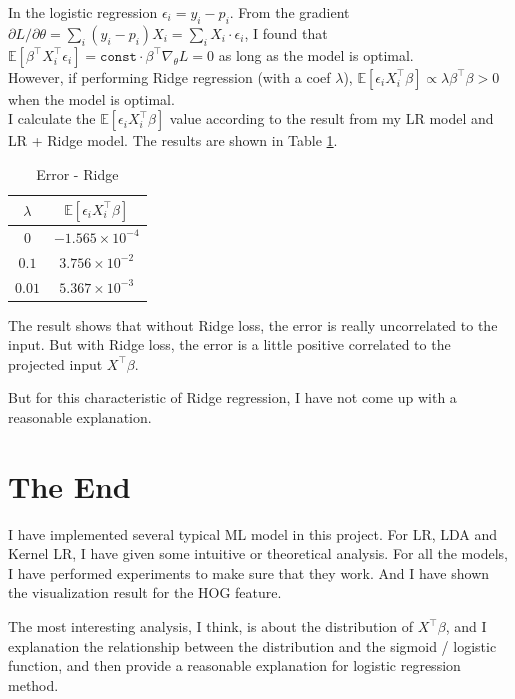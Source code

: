 \documentclass{article}
\begin{document}
In the logistic regression $\epsilon_i = y_i - p_i$. From the gradient $\partial L/\partial\theta = \sum_{i} (y_i-p_i)X_i = \sum_{i} X_i\cdot \epsilon_i$, I found that $\mathbb{E}[\beta^\top X_i^\top \epsilon_i]=\mathtt{const}\cdot \beta^\top \nabla_\theta L = 0$ as long as the model is optimal.\\

However, if performing Ridge regression (with a coef $\lambda$), $\mathbb{E}[\epsilon_i X^\top_i\beta] \propto \lambda \beta^\top\beta > 0$ when the model is optimal.  \\

I calculate the $\mathbb{E}[\epsilon_i X^\top_i\beta]$ value according to the result from my LR model and LR + Ridge model. The results are shown in Table \ref{error}.
\begin{table}[H]
    \centering
    \caption{Error - Ridge}
    \label{error}
    \begin{tabular}{c|c}
        \hline
        $\lambda$ & $\mathbb{E}[\epsilon_i X_i^\top\beta]$\\
        \hline
        $0$ & $-1.565\times 10^{-4}$\\
        $0.1$ & $3.756\times 10^{-2}$\\
        $0.01$ & $5.367\times 10^{-3}$\\
        \hline        
    \end{tabular}
\end{table}
The result shows that without Ridge loss, the error is really uncorrelated to the input. But with Ridge loss, the error is a little positive correlated to the projected input $X^\top\beta$.

But for this characteristic of Ridge regression, I have not come up with a reasonable explanation.
\section{The End}
I have implemented several typical ML model in this project. For LR, LDA and Kernel LR, I have given some intuitive or theoretical analysis. For all the models, I have performed experiments to make sure that they work. And I have shown the visualization result for the HOG feature. 

The most interesting analysis, I think, is about the distribution of $X^\top\beta$, and I explanation the relationship between the distribution and the sigmoid / logistic function, and then provide a reasonable explanation for logistic regression method.
\end{document}
